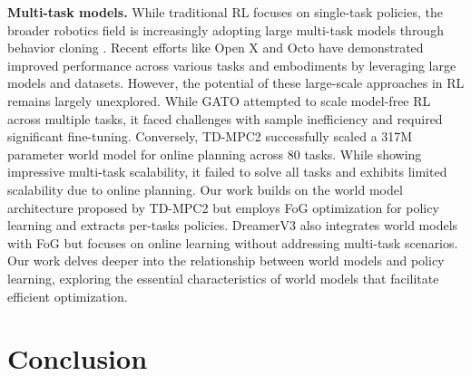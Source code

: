 \documentclass{article} %
\begin{document}
\textbf{Multi-task models.} While traditional RL focuses on single-task policies, the broader robotics field is increasingly adopting large multi-task models through behavior cloning \citet{firoozi2023foundation}. Recent efforts like Open X \citet{padalkar2023open} and Octo \citet{team2023octo} have demonstrated improved performance across various tasks and embodiments by leveraging large models and datasets. However, the potential of these large-scale approaches in RL remains largely unexplored. While GATO \citet{reed2022generalist} attempted to scale model-free RL across multiple tasks, it faced challenges with sample inefficiency and required significant fine-tuning. Conversely, TD-MPC2 \citet{hansen2023td} successfully scaled a 317M parameter world model for online planning across 80 tasks. While showing impressive multi-task scalability, it failed to solve all tasks and exhibits limited scalability due to online planning. Our work builds on the world model architecture proposed by TD-MPC2 but employs FoG optimization for policy learning and extracts per-tasks policies. DreamerV3 \citet{hafner2023mastering} also integrates world models with FoG but focuses on online learning without addressing multi-task scenarios. Our work delves deeper into the relationship between world models and policy learning, exploring the essential characteristics of world models that facilitate efficient optimization.

\section{Conclusion} \label{sec:conclusion}

\end{document}
